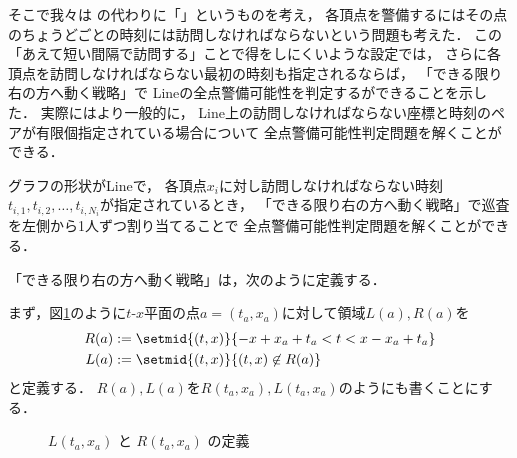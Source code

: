 そこで我々は
{\timelimit}の代わりに「{\interval}」というものを考え，
各頂点を警備するにはその点の{\interval}ちょうどごとの時刻には訪問しなければならないという問題も考えた．
この「あえて短い間隔で訪問する」ことで得をしにくいような設定では，
さらに各頂点を訪問しなければならない最初の時刻も指定されるならば，
「できる限り右の方へ動く戦略」で
Lineの全点警備可能性を判定するができることを示した．
実際にはより一般的に，
Line上の訪問しなければならない座標と時刻のペアが有限個指定されている場合について
全点警備可能性判定問題を解くことができる．



\begin{theo}
	\label{theo:LineExactFinite}
	グラフの形状がLineで，
	各頂点$x_i$に対し訪問しなければならない時刻
	$t_{i,1}, t_{i,2}, \ldots, t_{i,{N_i}}$が指定されているとき，
	「できる限り右の方へ動く戦略」で巡査を左側から1人ずつ割り当てることで
	全点警備可能性判定問題を解くことができる．
\end{theo}


「できる限り右の方へ動く戦略」は，次のように定義する．

まず，図\ref{tikz:defLR}のように$t$-$x$平面の点$a = (t_a,x_a)$に対して領域$L(a), R(a)$を
\begin{align*}
	R(a) &:= \setmid{(t,x)}{ -x + x_a + t_a < t < x - x_a + t_a } \\
	L(a) &:= \setmid{(t,x)}{ (t,x) \not\in R(a) }
\end{align*}
と定義する．
$R(a),L(a)$を$R(t_a,x_a),L(t_a,x_a)$のようにも書くことにする．

\begin{figure}[h]
	\centering
	\caption{$L(t_a,x_a)$ と $R(t_a,x_a)$ の定義 \label{tikz:defLR}}
\end{figure}



